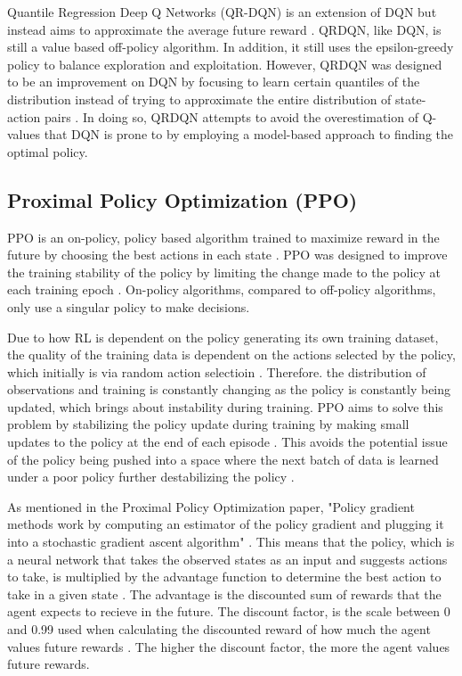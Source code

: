 Quantile Regression Deep Q Networks (QR-DQN) is an extension of DQN but instead aims to approximate the average future reward \cite{dabney2018distributional}. QRDQN, like DQN, is still a value based off-policy algorithm. In addition, it still uses the epsilon-greedy policy to balance exploration and exploitation. However, QRDQN was designed to be an improvement on DQN by focusing to learn certain quantiles of the distribution instead of trying to approximate the entire distribution of state-action pairs \cite{dabney2018distributional}. In doing so, QRDQN attempts to avoid the overestimation of Q-values that DQN is prone to by employing a model-based approach to finding the optimal policy.

\subsection{Proximal Policy Optimization (PPO)}

PPO is an on-policy, policy based algorithm trained to maximize reward in the future by choosing the best actions in each state \cite{deepcheckRL}. PPO was designed to improve the training stability of the policy by limiting the change made to the policy at each training epoch \cite{ThomasSimonini2022A2C}. On-policy algorithms, compared to off-policy algorithms, only use a singular policy to make decisions.

Due to how RL is dependent on the policy generating its own training dataset, the quality of the training data is dependent on the actions selected by the policy, which initially is via random action selectioin \cite{XanderSteenbrugge2019ppo}. Therefore. the distribution of observations and training is constantly changing as the policy is constantly being updated, which brings about instability during training. PPO aims to solve this problem by stabilizing the policy update during training by making small updates to the policy at the end of each episode \cite{XanderSteenbrugge2019intro}. This avoids the potential issue of the policy being pushed into a space where the next batch of data is learned under a poor policy further destabilizing the policy \cite{XanderSteenbrugge2019ppo}.

As mentioned in the Proximal Policy Optimization paper, "Policy gradient methods work by computing an estimator of the policy gradient and plugging it into a stochastic gradient ascent algorithm" \cite{schulman2017proximal}. This means that the policy, which is a neural network that takes the observed states as an input and suggests actions to take, is multiplied by the advantage function to determine the best action to take in a given state \cite{schulman2017proximal}. The advantage is the discounted sum of rewards that the agent expects to recieve in the future. The discount factor, is the scale between 0 and 0.99 used when calculating the discounted reward of how much the agent values future rewards \cite{XanderSteenbrugge2019ppo}. The higher the discount factor, the more the agent values future rewards. 

